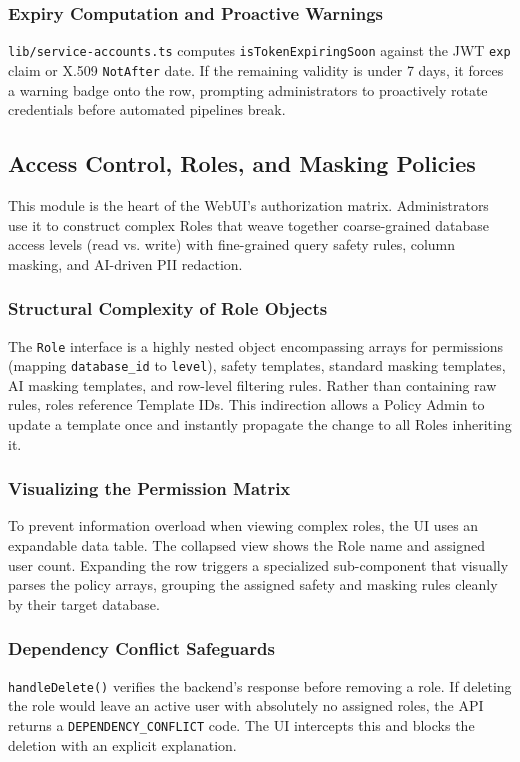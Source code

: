 \subsubsection{Expiry Computation and Proactive Warnings}
\texttt{lib/service-accounts.ts} computes \texttt{isTokenExpiringSoon} against the JWT \texttt{exp} claim or X.509 \texttt{NotAfter} date. If the remaining validity is under 7 days, it forces a warning badge onto the row, prompting administrators to proactively rotate credentials before automated pipelines break.

\subsection{Access Control, Roles, and Masking Policies}
This module is the heart of the WebUI's authorization matrix. Administrators use it to construct complex Roles that weave together coarse-grained database access levels (read vs. write) with fine-grained query safety rules, column masking, and AI-driven PII redaction.

\subsubsection{Structural Complexity of Role Objects}
The \texttt{Role} interface is a highly nested object encompassing arrays for permissions (mapping \texttt{database\_id} to \texttt{level}), safety templates, standard masking templates, AI masking templates, and row-level filtering rules. Rather than containing raw rules, roles reference Template IDs. This indirection allows a Policy Admin to update a template once and instantly propagate the change to all Roles inheriting it.

\subsubsection{Visualizing the Permission Matrix}
To prevent information overload when viewing complex roles, the UI uses an expandable data table. The collapsed view shows the Role name and assigned user count. Expanding the row triggers a specialized sub-component that visually parses the policy arrays, grouping the assigned safety and masking rules cleanly by their target database.

\subsubsection{Dependency Conflict Safeguards}
\texttt{handleDelete()} verifies the backend's response before removing a role. If deleting the role would leave an active user with absolutely no assigned roles, the API returns a \texttt{DEPENDENCY\_CONFLICT} code. The UI intercepts this and blocks the deletion with an explicit explanation.


